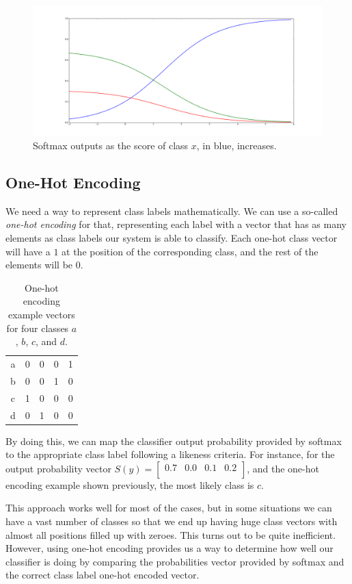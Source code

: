 \documentclass[english, 11pt]{article}
\begin{document}
	\begin{figure}[!hbt]
		\centering
		\includegraphics[width=0.8\linewidth]{l1/figures/softmax_output}
		\caption{Softmax outputs as the score of class $x$, in blue, increases.}
		\label{fig:softmax}
	\end{figure}

	\subsection{One-Hot Encoding}

	We need a way to represent class labels mathematically. We can use a so-called \emph{one-hot encoding} for that, representing each label with a vector that has as many elements as class labels our system is able to classify. Each one-hot class vector will have a $1$ at the position of the corresponding class, and the rest of the elements will be $0$.

	\begin{table}[!hbt]
		\centering
		\begin{tabular}{c|cccc}
			a & 0 & 0 & 0 & 1\\
			b & 0 & 0 & 1 & 0\\
			c & 1 & 0 & 0 & 0\\
			d & 0 & 1 & 0 & 0\\
		\end{tabular}
		\caption{One-hot encoding example vectors for four classes $a$, $b$, $c$, and $d$.}
	\end{table}

By doing this, we can map the classifier output probability provided by softmax to the appropriate class label following a likeness criteria. For instance, for the output probability vector $S(y)=\begin{bmatrix} 0.7 & 0.0 & 0.1 & 0.2\\ \end{bmatrix}$, and the one-hot encoding example shown previously, the most likely class is $c$.

	This approach works well for most of the cases, but in some situations we can have a vast number of classes so that we end up having huge class vectors with almost all positions filled up with zeroes. This turns out to be quite inefficient. However, using one-hot encoding provides us a way to determine how well our classifier is doing by comparing the probabilities vector provided by softmax and the correct class label one-hot encoded vector.
\end{document}
